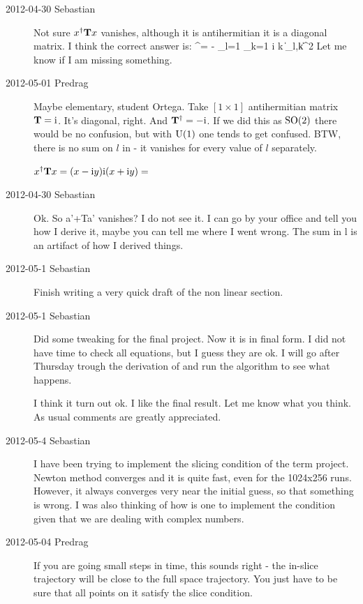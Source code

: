 \begin{description}
\item[2012-04-30 Sebastian]
Not sure $x^\dagger \mathbf{T} x$ vanishes, although it is antihermitian
it is a diagonal matrix. I think the correct answer is:
\beq
\ssp^\dagger \Lg \ssp = - \sum_{l=1} \sum_{k=1} i k \| \ssp_{l,k}\|^2
Let me know if I am missing something.

\item[2012-05-01 Predrag]
Maybe elementary, student Ortega. Take $[1\!\times\!1]$ antihermitian matrix $\mathbf{T} = \mathrm{i}$.
It's diagonal, right. And  $\mathbf{T}^\dagger = - \mathrm{i}$. If we did this as $\textrm{SO}(2)$ there would be
no confusion, but with $\textrm{U}(1)$ one tends to get confused. BTW, there is no sum on $l$ in
 - it vanishes for every value of $l$ separately.

$x^\dagger \mathbf{T} x= (x-\mathrm{i} y)\mathrm{i} (x+\mathrm{i} y) = $

\item[2012-04-30 Sebastian]
Ok. So a'+Ta' vanishes? I do not see it. I can go by your office and tell
you how I derive it, maybe you can tell me where I went wrong. The sum in
l is an artifact of how I derived things.

\item[2012-05-1 Sebastian]
Finish writing a very quick draft of the non linear section.

\item[2012-05-1 Sebastian]
Did some tweaking for the final project. Now it is in final form. I did
not have time to check all equations, but I guess they are ok. I will go
after Thursday trough the derivation of  and run the
algorithm to see what happens.

I think it turn out ok. I like the final result. Let me know what you
think. As usual comments are greatly appreciated.

\item[2012-05-4 Sebastian]
I have been trying to implement the slicing condition of the term
project. Newton method converges and it is quite fast, even for the
1024x256 runs. However, it always converges very near the initial guess,
so that something is wrong. I was also thinking of how is one to
implement the {\chartBord} condition given that we are dealing with complex
numbers.

\item[2012-05-04 Predrag] If you are going small steps in time, this
sounds right - the in-slice trajectory will be close to the full space
trajectory. You just have to be sure that all points on it satisfy the
slice condition.


\end{description}
